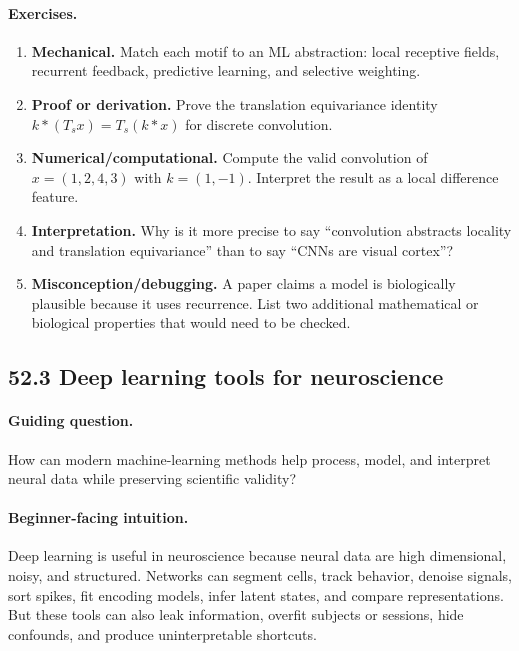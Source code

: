 \paragraph{Exercises.}
\begin{enumerate}[label=\textbf{52.2.\arabic*.}, leftmargin=*]
\item \textbf{Mechanical.} Match each motif to an ML abstraction: local receptive fields, recurrent feedback, predictive learning, and selective weighting.
\item \textbf{Proof or derivation.} Prove the translation equivariance identity \(k*(T_sx)=T_s(k*x)\) for discrete convolution.
\item \textbf{Numerical/computational.} Compute the valid convolution of \(x=(1,2,4,3)\) with \(k=(1,-1)\). Interpret the result as a local difference feature.
\item \textbf{Interpretation.} Why is it more precise to say ``convolution abstracts locality and translation equivariance'' than to say ``CNNs are visual cortex''?
\item \textbf{Misconception/debugging.} A paper claims a model is biologically plausible because it uses recurrence. List two additional mathematical or biological properties that would need to be checked.
\end{enumerate}

\subsection{52.3 Deep learning tools for neuroscience}

\paragraph{Guiding question.}
How can modern machine-learning methods help process, model, and interpret neural data while preserving scientific validity?

\paragraph{Beginner-facing intuition.}
Deep learning is useful in neuroscience because neural data are high dimensional, noisy, and structured. Networks can segment cells, track behavior, denoise signals, sort spikes, fit encoding models, infer latent states, and compare representations. But these tools can also leak information, overfit subjects or sessions, hide confounds, and produce uninterpretable shortcuts.

